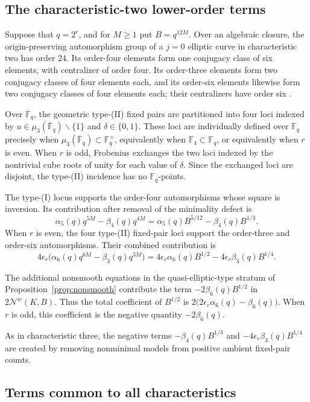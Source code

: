 \documentclass[a4paper,12pt]{amsart}
\theoremstyle{definition}
\newcommand{\Fb}{\mathbb{F}}
\newcommand{\Nc}{\mathcal{N}}
\renewcommand{\setminus}{\smallsetminus}
\begin{document}
\subsection{The characteristic-two lower-order terms}

Suppose that $q=2^r$, and for $M\geq1$ put $B=q^{12M}$.  Over an algebraic closure, the origin-preserving automorphism group of a $j=0$ elliptic curve in characteristic two has order $24$.  Its order-four elements form one conjugacy class of six elements, with centralizer of order four.  Its order-three elements form two conjugacy classes of four elements each, and its order-six elements likewise form two conjugacy classes of four elements each; their centralizers have order six \cite[Proposition~3.1]{KST}.

Over $\overline{\Fb}_q$, the geometric type-(II) fixed pairs are partitioned into four loci indexed by $u\in\mu_3(\overline{\Fb}_q)\setminus\{1\}$ and $\delta\in\{0,1\}$.  These loci are individually defined over $\Fb_q$ precisely when $\mu_3(\overline{\Fb}_q)\subset\Fb_q^\times$, equivalently when $\Fb_4\subset\Fb_q$, or equivalently when $r$ is even.  When $r$ is odd, Frobenius exchanges the two loci indexed by the nontrivial cube roots of unity for each value of $\delta$.  Since the exchanged loci are disjoint, the type-(II) incidence has no $\Fb_q$-points.

The type-(I) locus supports the order-four automorphisms whose square is inversion.  Its contribution after removal of the minimality defect is
\[
\alpha_5(q)q^{5M}-\beta_4(q)q^{4M}
=
\alpha_5(q)B^{5/12}-\beta_4(q)B^{1/3}.
\]
When $r$ is even, the four type-(II) fixed-pair loci support the order-three and order-six automorphisms.  Their combined contribution is
\[
4\epsilon_r\bigl(\alpha_6(q)q^{6M}-\beta_3(q)q^{3M}\bigr)
=
4\epsilon_r\alpha_6(q)B^{1/2}
-4\epsilon_r\beta_3(q)B^{1/4}.
\]

The additional nonsmooth equations in the quasi-elliptic-type stratum of Proposition~\ref{prop:nonsmooth} contribute the term $-2\beta_6(q)B^{1/2}$ in $2\Nc^w(K,B)$.  Thus the total coefficient of $B^{1/2}$ is $2\bigl(2\epsilon_r\alpha_6(q)-\beta_6(q)\bigr)$.  When $r$ is odd, this coefficient is the negative quantity $-2\beta_6(q)$.

As in characteristic three, the negative terms $-\beta_4(q)B^{1/3}$ and $-4\epsilon_r\beta_3(q)B^{1/4}$ are created by removing nonminimal models from positive ambient fixed-pair counts.

\subsection{Terms common to all characteristics}
\end{document}
